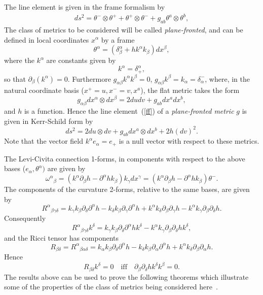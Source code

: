 \documentclass[12pt,a4paper]{article}
\newcounter{theorem}
\newcounter{eg}
\def\p{\partial}
\begin{document}
The line element is given in the frame formalism by
\begin{eqnarray}
ds^{2} = \theta^{-}\otimes\theta^{+} + \theta^{+}\otimes\theta^{-} +
g_{ab}\theta^{a}\otimes\theta^{b},                         \label{ff}
\end{eqnarray}
The class of metrics to be considered will be called 
{\it  plane-fronted}, and can be defined in local coordinates $x^{\alpha}$
by a frame
\begin{equation}
\theta^{\alpha} = (\delta_{\beta}^{\alpha} + 
h k^{\alpha} k_{\beta}) dx^{\beta},
\end{equation}
where the $k^{\alpha}$ are constants given by
\begin{equation}
k^{\alpha}=\delta_{+}^{\alpha},
\end{equation}
so that $\partial_{\beta}(k^{\alpha}) = 0$. Furthermore 
$g_{\alpha\beta}k^{\alpha}k^{\beta} = 0$,  
$g_{\alpha\beta}k^{\beta}=k_{\alpha} =\delta_{\alpha}^{-}$, where, 
in the natural coordinate basis ($x^{+}=u,x^{-}=v,x^{a}$), the flat 
metric takes the form
$$
g_{\alpha\beta}dx^{\alpha}\otimes dx^{\beta} = 2dudv + g_{ab}dx^{a}dx^{b},
$$
and $h$ is a function. Hence the line element~(\ref{ff}) of a {\it
plane-fronted metric} $g$ is given in Kerr-Schild form by
$$
ds^{2} = 2du\otimes dv + g_{ab}dx^{a}\otimes dx^{b} + 2h (dv)^{2}.
$$
Note that the vector field $k^{\alpha}e_{\alpha}=e_{+}$ is a null
vector with respect to these metrics.

The Levi-Civita connection 1-forms, in components with respect to the above
bases ($e_{\alpha},\theta^{\alpha})$ are given by
$$
\omega^{\alpha}{}_{\beta} = (k^{\alpha}\p_\beta h - 
\p^\alpha h k_{\beta})k_{\gamma}dx^{\gamma} =
(k^{\alpha}\p_\beta h -\p^\alpha h k_{\beta})\theta^{-}.
$$
The components of the curvature 2-forms, relative to the same bases,
are given by
$$
R^{\alpha}{}_{\beta\gamma\delta} =
k_{\gamma}k_{\beta}\p_\delta \p^{\alpha}h -
k_{\delta}k_{\beta}\p_{\gamma}\p^{\alpha} h + k^{\alpha}
k_{\delta} \p_{\beta}\p_{\gamma}h - 
k^{\alpha}k_{\gamma} \p_{\beta}\p_{\delta} h.
$$
Consequently
$$
R^{\alpha}{}_{\beta\gamma\delta} k^{\delta} = 
k_{\gamma}k_{\beta}\p_\delta \p^{\alpha} h k^{\delta} - 
k^{\alpha}k_{\gamma}\p_{\beta}\p_{\delta} h k^{\delta},
$$
and the Ricci tensor has components
$$
 R_{\beta\delta} = R^{\alpha}{}_{\beta\alpha\delta}
= k_{\alpha}k_{\beta}\p_\delta \p^{\alpha} h - 
k_{\delta} k_{\beta}\p_\alpha \p^{\alpha} h + 
k^{\alpha} k_{\delta} \p_{\beta}\p_{\alpha} h.
$$
Hence
$$
R_{\beta\delta}k^{\delta}=0 \quad \mbox{iff} \quad
\p_{\beta}\p_{\delta}hk^{\delta}k^{\beta}=0.
$$
The results above can be used to prove the following theorems which
illustrate some of the properties of the class of metrics being
considered here~\cite{KraSteMacHer80,MisThoWhe73,EhlKun62,Pir65,Gri91}.
\end{document}
